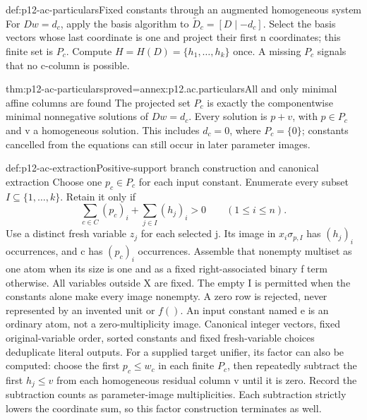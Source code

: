 \begin{hbmethod}{def:p12-ac-particulars}{Fixed constants through an augmented homogeneous system}
For \(Dw=d_c\), apply the basis algorithm to
\(\widetilde D_c=[D\mid -d_c]\). Select the basis vectors whose
last coordinate is one and project their first n coordinates; this
finite set is \(P_c\). Compute \(H=H(D)=\{h_1,\ldots,h_k\}\)
once. A missing \(P_c\) signals that no c-column is possible.
\end{hbmethod}

\begin{hblemma}{thm:p12-ac-particulars}{proved=annex:p12.ac.particulars}{All and only minimal affine columns are found}
The projected set \(P_c\) is exactly the componentwise minimal
nonnegative solutions of \(Dw=d_c\). Every solution is
\(p+v\), with \(p\in P_c\) and v a homogeneous solution.
This includes \(d_c=0\), where \(P_c=\{0\}\); constants
cancelled from the equations can still occur in later parameter images.
\end{hblemma}

\begin{hbmethod}{def:p12-ac-extraction}{Positive-support branch construction and canonical extraction}
Choose one \(p_c\in P_c\) for each input constant. Enumerate
every subset \(I\subseteq\{1,\ldots,k\}\). Retain it only if
\[
             \sum_{c\in C}(p_c)_i+\sum_{j\in I}(h_j)_i>0
                    \qquad(1\leq i\leq n).
\]
Use a distinct fresh variable \(z_j\) for each selected j. Its
image in \(x_i\sigma_{p,I}\) has \((h_j)_i\) occurrences,
and c has \((p_c)_i\) occurrences. Assemble that nonempty multiset
as one atom when its size is one and as a fixed right-associated
binary f term otherwise. All variables outside X are fixed.
The empty I is permitted when the constants alone make every image
nonempty. A zero row is rejected, never represented by an invented
unit or \(f()\). An input constant named e is an ordinary atom,
not a zero-multiplicity image.
Canonical integer vectors, fixed original-variable order, sorted
constants and fixed fresh-variable choices deduplicate literal outputs.
For a supplied target unifier, its factor can also be computed:
choose the first \(p_c\leq w_c\) in each finite \(P_c\), then
repeatedly subtract the first \(h_j\leq v\) from each homogeneous
residual column v until it is zero. Record the subtraction counts as
parameter-image multiplicities. Each subtraction strictly lowers the
coordinate sum, so this factor construction terminates as well.
\end{hbmethod}

